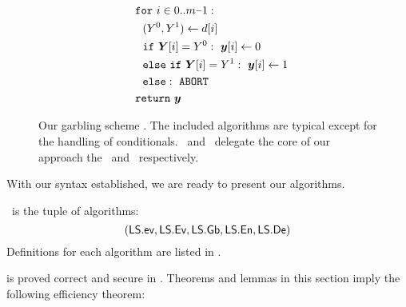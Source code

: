 \begin{figure}
\begin{adjustwidth}{-0.1\textwidth}{-0.1\textwidth}
\begin{minipage}[t]{0.40\linewidth}
\begin{align*}
      &~~\cfor~i \in 0.. m\minus 1:\\
      &~~~~(Y^0, Y^1) \gets d[i]\\
      &~~~~\cif~\gcirout[i] = Y^0:~\cirout[i] \gets 0\\
      &~~~~\celse~\cif~\gcirout[i] = Y^1:~\cirout[i] \gets 1\\
      &~~~~\celse:~\mathtt{ABORT}\\
      &~~\creturn~\cirout
    \end{align*}
  \end{minipage}
  \end{adjustwidth}
  \caption{%
    Our garbling scheme \ourschemelong.
    The included algorithms are typical except for the handling of
    conditionals.
    \gEv\ and \gGb\ delegate the core of our approach the \evcond\ and
    \gbcond\ respectively.
  }\label{fig:scheme}
\end{figure}


With our syntax established, we are ready to present our algorithms.
\begin{construction}[\ourschemelong]\label{ourconstr}
  \ourschemelong\ is the tuple of algorithms:
  \[ (\textsf{LS}.\textsf{ev}, \textsf{LS}.\textsf{Ev}, \textsf{LS}.\textsf{Gb}, \textsf{LS}.\textsf{En}, \textsf{LS}.\textsf{De}) \]
  Definitions for each algorithm are listed in .
\end{construction}

 is proved correct and secure in .
Theorems and lemmas in this section imply the following efficiency theorem:

